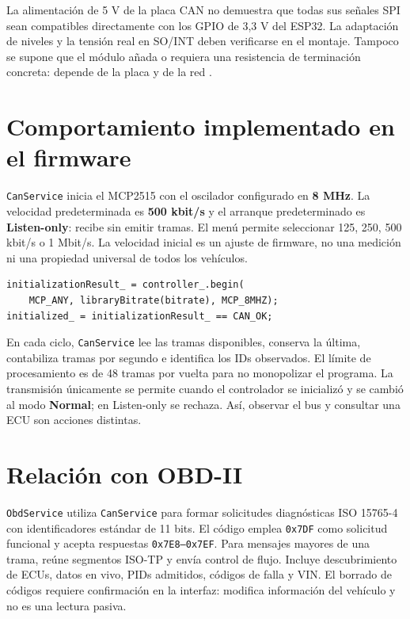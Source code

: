 \documentclass[11pt,letterpaper]{article}
\begin{document}
La alimentación de 5 V de la placa CAN no demuestra que todas sus señales
SPI sean compatibles directamente con los GPIO de 3,3 V del ESP32. La
adaptación de niveles y la tensión real en SO/INT deben verificarse en el
montaje. Tampoco se supone que el módulo añada o requiera una resistencia de
terminación concreta: depende de la placa y de la red \cite{canfisica}.

\section{Comportamiento implementado en el firmware}
\texttt{CanService} inicia el MCP2515 con el oscilador configurado en
\textbf{8 MHz}. La velocidad predeterminada es \textbf{500 kbit/s} y el
arranque predeterminado es \textbf{Listen-only}: recibe sin emitir tramas. El
menú permite seleccionar 125, 250, 500 kbit/s o 1 Mbit/s. La velocidad
inicial es un ajuste de firmware, no una medición ni una propiedad universal
de todos los vehículos.

\begin{lstlisting}[caption={Fragmento de inicialización de \texttt{CanService.cpp}.}]
initializationResult_ = controller_.begin(
    MCP_ANY, libraryBitrate(bitrate), MCP_8MHZ);
initialized_ = initializationResult_ == CAN_OK;
\end{lstlisting}

En cada ciclo, \texttt{CanService} lee las tramas disponibles, conserva la
última, contabiliza tramas por segundo e identifica los IDs observados. El
límite de procesamiento es de 48 tramas por vuelta para no monopolizar el
programa. La transmisión únicamente se permite cuando el controlador se
inicializó y se cambió al modo \textbf{Normal}; en Listen-only se rechaza.
Así, observar el bus y consultar una ECU son acciones distintas.

\section{Relación con OBD-II}
\texttt{ObdService} utiliza \texttt{CanService} para formar solicitudes
diagnósticas ISO 15765-4 con identificadores estándar de 11 bits. El código
emplea \texttt{0x7DF} como solicitud funcional y acepta respuestas
\texttt{0x7E8--0x7EF}. Para mensajes mayores de una trama, reúne segmentos
ISO-TP y envía control de flujo. Incluye descubrimiento de ECUs, datos en
vivo, PIDs admitidos, códigos de falla y VIN. El borrado de códigos requiere
confirmación en la interfaz: modifica información del vehículo y no es una
lectura pasiva.
\end{document}

